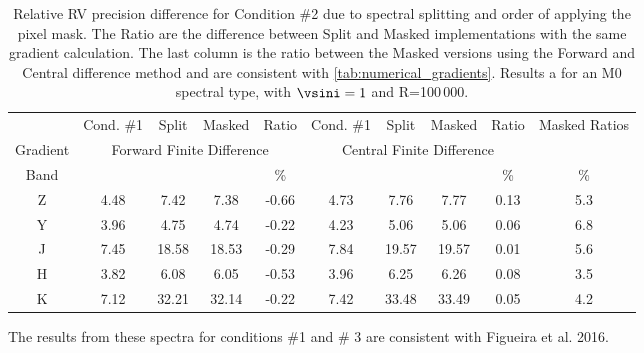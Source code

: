 
\begin{table}
    \caption[Relative {RV} precision difference from splitting and order of operations.]{Relative {RV} precision difference for Condition \#2 due to spectral splitting and order of applying the pixel mask. The Ratio are the difference between Split and Masked implementations with the same gradient calculation. The last column is the ratio between the Masked versions using the Forward and Central difference method and are consistent with \cref{tab:numerical_gradients}. Results a for an M0 spectral type, with $\vsini=1$ and R=100\,000.}
    \begin{tabular}{c|cccc|cccc|c}
        \toprule
        & Cond. \#1 & Split & Masked & Ratio &  Cond. \#1 & Split & Masked & Ratio & Masked Ratios\\
        Gradient &  \multicolumn{4}{c|}{Forward Finite Difference}  &  \multicolumn{4}{c|}{Central Finite Difference} & \\

        Band & \mps{} & \mps{} & \mps{} &  \%  & \mps{} & \mps{} & \mps{} &   \% & \% \\
        \midrule

        Z & 4.48 &  7.42 &  7.38 & -0.66 &  4.73 &  7.76 &  7.77 & 0.13 & 5.3\\
        Y & 3.96 &  4.75 &  4.74 & -0.22 &  4.23 &  5.06 &  5.06 & 0.06 & 6.8\\
        J & 7.45 & 18.58 & 18.53 & -0.29 &  7.84 & 19.57 & 19.57 & 0.01 & 5.6\\
        H & 3.82 &  6.08 &  6.05 & -0.53 &  3.96 &  6.25 &  6.26 & 0.08 & 3.5\\
        K & 7.12 & 32.21 & 32.14 & -0.22 &  7.42 & 33.48 & 33.49 & 0.05 & 4.2\\
        \bottomrule
    \end{tabular}
\end{table}

{\red{} The results from these spectra for conditions \#1 and \# 3 are consistent with Figueira et al. 2016. }

